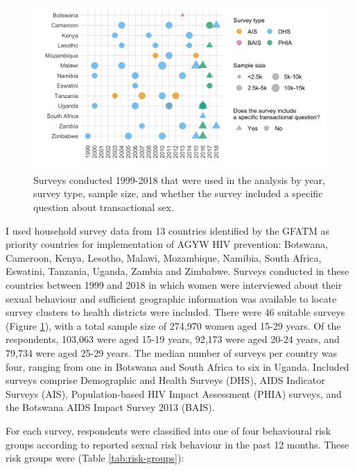 \documentclass[a4paper, nobind]{templates/ociamthesis}
\begin{document}
\begin{figure}

{\centering \includegraphics[width=0.95\linewidth]{resources/multi-agyw/20230627-144735-3da88508/depends/available-surveys} 

}

\caption{Surveys conducted 1999-2018 that were used in the analysis by year, survey type, sample size, and whether the survey included a specific question about transactional sex.}\label{fig:available-surveys}
\end{figure}

I used household survey data from 13 countries identified by the GFATM as priority countries for implementation of AGYW HIV prevention: Botswana, Cameroon, Kenya, Lesotho, Malawi, Mozambique, Namibia, South Africa, Eswatini, Tanzania, Uganda, Zambia and Zimbabwe.
Surveys conducted in these countries between 1999 and 2018 in which women were interviewed about their sexual behaviour and sufficient geographic information was available to locate survey clusters to health districts were included.
There were 46 suitable surveys (Figure \ref{fig:available-surveys}), with a total sample size of 274,970 women aged 15-29 years.
Of the respondents, 103,063 were aged 15-19 years, 92,173 were aged 20-24 years, and 79,734 were aged 25-29 years.
The median number of surveys per country was four, ranging from one in Botswana and South Africa to six in Uganda.
Included surveys comprise Demographic and Health Surveys (DHS), AIDS Indicator Surveys (AIS), Population-based HIV Impact Assessment (PHIA) surveys, and the Botswana AIDS Impact Survey 2013 (BAIS).

For each survey, respondents were classified into one of four behavioural risk groups according to reported sexual risk behaviour in the past 12 months.
These risk groups were (Table \ref{tab:risk-groups}):
\end{document}
